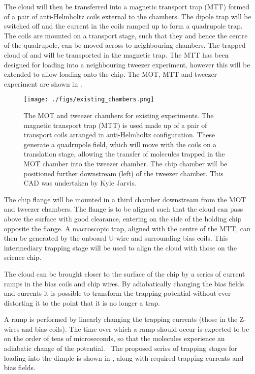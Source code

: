 
The cloud will then be transferred into a magnetic transport trap (MTT) formed of
a pair of anti-Helmholtz coils external to the chambers. The dipole trap will be
switched off and the current in the coils ramped up to form a quadrupole trap.
The coils are mounted on a transport stage, such that they and hence the centre
of the quadrupole, can be moved across to neighbouring chambers. The trapped
cloud of \CaF{} and \esRb{} will be transported in the magnetic trap.
The MTT has been designed for loading into a neighbouring tweezer experiment,
however this will be extended to allow loading onto the chip. The MOT, MTT and
tweezer experiment are shown in . 

\begin{figure}[ht]
  \texttt{[image: ./figs/existing\_chambers.png]}
  \caption{
    The MOT and tweezer chambers for existing experiments. The magnetic
    transport trap (MTT) is used made up of a pair of transport coils arranged
    in anti-Helmholtz configuration. These generate a quadrupole field, which
    will move with the coils on a translation stage, allowing the transfer of
    molecules trapped in the MOT chamber into the tweezer chamber. The chip
    chamber will be positioned further downstream (left) of the tweezer chamber.
    This CAD was undertaken by Kyle Jarvis.
  }
  \label{experiment:fig:MTTsetup}
\end{figure}

The chip flange will be mounted in a third chamber downstream from the MOT and
tweezer chambers. The flange is to be aligned such that the cloud can pass above
the surface with good clearance, entering on the side of the holding chip opposite
the flange. A macroscopic trap, aligned with the centre of the MTT, can then be
generated by the onboard U-wire and surrounding bias coils. This intermediary
trapping stage will be used to align the cloud with those on the science chip.

The cloud can be brought closer to the surface of the chip by a series of
current ramps in the bias coils and chip wires. By adiabatically changing the
bias fields and currents it is possible to transform the trapping potential
without ever distorting it to the point that it is no longer a trap.

A ramp is performed by linearly changing the trapping currents (those in the
Z-wires and bias coils). The time over which a ramp should occur is expected to
be on the order of tens of microseconds, so that the molecules experience an
adiabatic change of the potential.~\cite{Boehi2009} The proposed series of
trapping stages for loading into the dimple is shown in
, along with required trapping currents and
bias fields.


